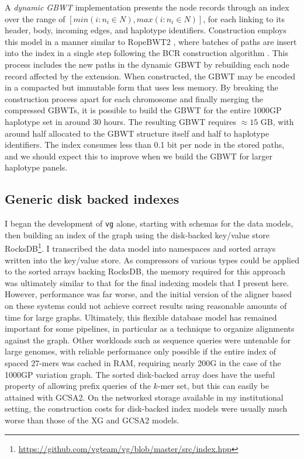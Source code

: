 A \emph{dynamic GBWT} implementation presents the node records through an index over the range of $[min(i : n_i \in N), max(i : n_i \in N)]$, for each linking to its header, body, incoming edges, and haplotype identifiers.
Construction employs this model in a manner similar to RopeBWT2 \cite{li2014fast}, where batches of paths are insert into the index in a single step following the BCR construction algorithm \cite{bauer2013lightweight}.
This process includes the new paths in the dynamic GBWT by rebuilding each node record affected by the extension.
When constructed, the GBWT may be encoded in a compacted but immutable form that uses less memory.
By breaking the construction process apart for each chromosome and finally merging the compressed GBWTs, it is possible to build the GBWT for the entire 1000GP haplotype set in around 30 hours.
The resulting GBWT requires $\approx 15$ GB, with around half allocated to the GBWT structure itself and half to haplotype identifiers.
The index consumes less than 0.1 bit per node in the stored paths, and we should expect this to improve when we build the GBWT for larger haplotype panels.

\subsection{Generic disk backed indexes}
\label{sec:generic_disk_backed_indexes}
I began the development of {\tt vg} alone, starting with schemas for the data models, then building an index of the graph using the disk-backed key/value store RocksDB\footnote{\url{https://github.com/vgteam/vg/blob/master/src/index.hpp}}.
I transcribed the data model into namespaces and sorted arrays written into the key/value store.
As compressors of various types could be applied to the sorted arrays backing RocksDB, the memory required for this approach was ultimately similar to that for the final indexing models that I present here.
However, performance was far worse, and the initial version of the aligner based on these systems could not achieve correct results using reasonable amounts of time for large graphs.
Ultimately, this flexible database model has remained important for some pipelines, in particular as a technique to organize alignments against the graph.
Other workloads such as sequence queries were untenable for large genomes, with reliable performance only possible if the entire index of spaced $27$-mers was cached in RAM, requiring nearly 200G in the case of the 1000GP variation graph.
The sorted disk-backed array does have the useful property of allowing prefix queries of the $k$-mer set, but this can easily be attained with GCSA2.
On the networked storage available in my institutional setting, the construction costs for disk-backed index models were usually much worse than those of the XG and GCSA2 models.

